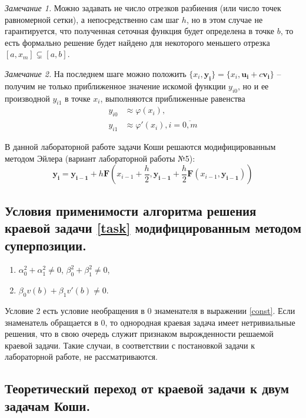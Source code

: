 \documentclass[a4paper, 12pt]{article}
\begin{document}
	\textit{Замечание 1.} Можно задавать не число отрезков разбиения (или число точек равномерной сетки), а непосредственно сам шаг $h$, но в этом случае не гарантируется, что полученная сеточная функция будет определена в точке $b$, то есть формально решение будет найдено для некоторого меньшего отрезка ${[a,x_m] \varsubsetneq [a,b]}$.
	
	\textit{Замечание 2.} На последнем шаге можно положить $\{x_i,\mathbf{y_i}\} = \{x_i,\mathbf{u_i}+c\mathbf{v_i}\}$ -- получим не только приближенное значение искомой функции $y_{i0}$, но и ее производной $y_{i1}$ в точке $x_i$, выполняются приближенные равенства
	\begin{equation}
		\begin{aligned}
			y_{i0} &\approx \varphi(x_i),\\
			y_{i1} &\approx \varphi'(x_i), i=\overline{0,m}
		\end{aligned}
	\end{equation} 

	В данной лабораторной работе задачи Коши решаются модифицированным методом Эйлера (вариант лабораторной работы №5):
	\begin{equation} \label{modeuler}
		\mathbf{y_i} = \mathbf{y_{i-1}} + h\mathbf{F}(x_{i-1} + \frac{h}{2}, \mathbf{y_{i-1}}+\frac{h}{2}\mathbf{F}(x_{i-1},\mathbf{y_{i-1}}))
	\end{equation}
	
	\subsection{Условия применимости алгоритма решения краевой задачи \eqref{task} модифицированным методом суперпозиции.}
	
	\begin{enumerate}
		\item $\alpha_0^2+\alpha_1^2\neq0$, $\beta_0^2+\beta_1^2\neq0$,
		\item $\beta_0v(b)+\beta_1v'(b) \neq 0$.
	\end{enumerate}

	Условие 2 есть условие необращения в 0 знаменателя в выражении \eqref{const}. Если знаменатель обращается в 0, то однородная краевая задача имеет нетривиальные решения, что в свою очередь служит признаком вырожденности решаемой краевой задачи. Такие случаи, в соответствии с постановкой задачи к лабораторной работе, не рассматриваются.
	
	\subsection{Теоретический переход от краевой задачи к двум задачам Коши.}
	
\end{document}
